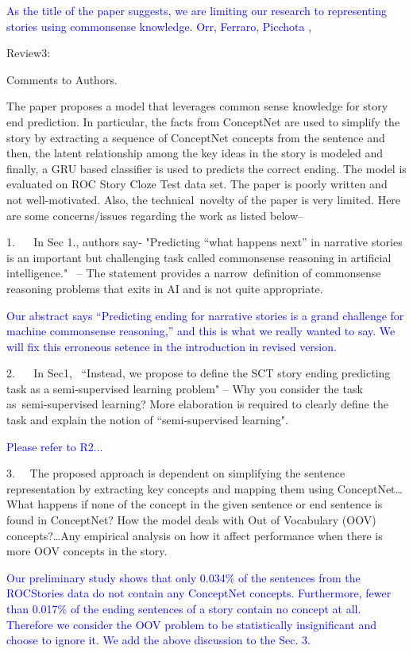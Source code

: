 \documentclass{article}
\newcommand{\shanshan}[1]{\textcolor{blue}{ #1}}
\begin{document}
\shanshan{As the title of the paper suggests, we are limiting our research to representing stories using commonsense knowledge. Orr, Ferraro, Picchota ,
}

Review3:

Comments to Authors.

The paper proposes a model that leverages common sense knowledge for story end prediction. In particular, the facts from ConceptNet are used to simplify the story by extracting a sequence of ConceptNet concepts from the sentence and then, the latent relationship among the key ideas in the story is modeled and finally, a GRU based classifier is used to predicts the correct ending. The model is evaluated on ROC Story Cloze Test data set.
The paper is poorly written and not well-motivated. Also, the technical novelty of the paper is very limited. Here are some concerns/issues regarding the work as listed below–

1.    In Sec 1., authors say- "Predicting “what happens next” in narrative stories is an important but challenging task called commonsense reasoning in artificial intelligence."  – The statement provides a narrow definition of commonsense reasoning problems that exits in AI and is not quite appropriate.

	\shanshan{Our abstract says ``Predicting ending for narrative stories is a grand challenge for machine commonsense reasoning,'' and this is what we really wanted to say.  We will fix this erroneous setence in the introduction in revised version.}
	
2.    In Sec1,  ``Instead, we propose to define the SCT story ending predicting task as a semi-supervised learning problem" – Why you consider the task as semi-supervised learning? More elaboration is required to clearly define the task and explain the notion of  ``semi-supervised learning".

	\shanshan{Please refer to R2...}

3.   The proposed approach is dependent on simplifying the sentence representation by extracting key concepts and mapping them using ConceptNet…What happens if none of the concept in the given sentence or end sentence is found in ConceptNet? How the model deals with Out of Vocabulary (OOV) concepts?…Any empirical analysis on how it affect performance when there is more OOV concepts in the story.

	\shanshan{Our preliminary study shows that only 0.034\% of the sentences from the ROCStories data do not contain any ConceptNet concepts. 
Furthermore, fewer than 0.017\% of the ending sentences of a story contain no concept at all. Therefore we consider the OOV problem to be statistically 
insignificant and choose to ignore it. We add the above discussion to the Sec. 3.} 
\end{document}
